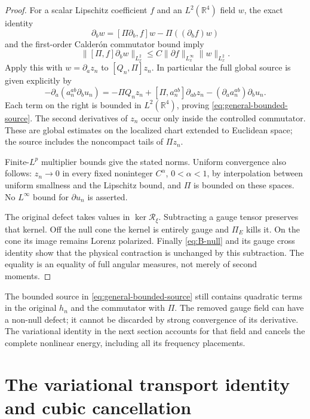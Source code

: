 \documentclass[11pt,a4paper]{article}
\numberwithin{equation}{section}
\newcommand{\R}{\mathbb R}
\theoremstyle{definition}
\begin{document}
\begin{proof}
For a scalar Lipschitz coefficient $f$ and an $L^2(\R^4)$ field $w$, the exact
identity
\begin{equation*}
[\Pi,f]\partial_bw=[\Pi\partial_b,f]w-\Pi((\partial_bf)w)
\end{equation*}
and the first-order Calder\'on commutator bound imply
\begin{equation*}
\|[\Pi,f]\partial_bw\|_{L^2_x}
\leq C\|\partial f\|_{L^\infty_x}\|w\|_{L^2_x}.
\end{equation*}
Apply this with $w=\partial_a z_n$ to $[Q_n,\Pi]z_n$.
In particular the full global source is given explicitly by
\begin{equation}\label{eq:general-explicit-source}
-\partial_a(a_n^{ab}\partial_bu_n)
=-\Pi Q_nz_n+[\Pi,a_n^{ab}]\partial_{ab}z_n
 -(\partial_aa_n^{ab})\partial_bu_n.
\end{equation}
Each term on the right is bounded in $L^2(\R^4)$, proving
\eqref{eq:general-bounded-source}. The second derivatives of $z_n$
occur only inside the controlled commutator. These are global estimates
on the localized chart extended to Euclidean space; the source includes
the noncompact tails of $\Pi z_n$.

Finite-$L^p$ multiplier bounds give the stated norms. Uniform convergence
also follows: $z_n\to0$ in every fixed noninteger $C^\alpha$, $0<\alpha<1$,
by interpolation between uniform smallness and the Lipschitz bound, and
$\Pi$ is bounded on these spaces. No $L^\infty$ bound for $\partial u_n$
is asserted.

The original defect takes values in $\ker\mathcal R_\xi$.
Subtracting a gauge tensor preserves that kernel. Off the null cone the
kernel is entirely gauge and $\Pi_E$ kills it. On the cone its image
remains Lorenz polarized. Finally \eqref{eq:B-null} and its gauge cross
identity show that the physical contraction is unchanged by this
subtraction. The equality is an equality of full angular measures,
not merely of second moments.
\end{proof}

The bounded source in \eqref{eq:general-bounded-source} still contains
quadratic terms in the original $h_n$ and the commutator with $\Pi$.
The removed gauge field can have a non-null defect; it cannot be discarded
by strong convergence of its derivative.
The variational identity in the next section accounts for that field
and cancels the complete nonlinear energy, including all its frequency
placements.

\section{The variational transport identity and cubic cancellation}
\label{sec:variational-transport}
\end{document}
